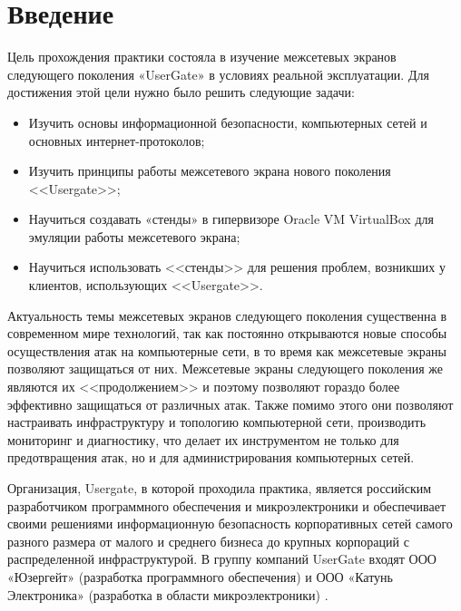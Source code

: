\newcommand{\definition}[1]{\textbf{#1}}

\newcommand{\CLIA}{\textbf{CLI-A}}
\newcommand{\CLIB}{\textbf{CLI-B}}
\newcommand{\CLIEXT}{\textbf{CLI-EXT}}
\newcommand{\DC}{\textbf{DC}}
\newcommand{\UTM}{\textbf{UTM}}
\newcommand{\ISP}{\textbf{ISP}}

\section{Введение}
	\begin{justify}
		\newPar{}Цель прохождения практики состояла в изучение межсетевых экранов следующего поколения «UserGate» в условиях реальной эксплуатации. Для достижения этой цели нужно было решить следующие задачи:
		
		\begin{itemize}[nosep]
			\item Изучить основы информационной безопасности, компьютерных сетей и основных интернет-протоколов;
			
			\item Изучить принципы работы межсетевого экрана нового поколения <<Usergate>>;
			
			\item Научиться создавать «стенды» в гипервизоре Oracle VM VirtualBox для эмуляции работы межсетевого экрана;
			
			\item Научиться использовать <<стенды>> для решения проблем, возникших у клиентов, использующих <<Usergate>>.
		\end{itemize}
		
		Актуальность темы межсетевых экранов следующего поколения существенна в современном мире технологий, так как постоянно открываются новые способы осуществления атак на компьютерные сети, в то время как межсетевые экраны позволяют защищаться от них. Межсетевые экраны следующего поколения же являются их <<продолжением>> и поэтому позволяют гораздо более эффективно защищаться от различных атак. Также помимо этого они позволяют настраивать инфраструктуру и топологию компьютерной сети, производить мониторинг и диагностику, что делает их инструментом не только для предотвращения атак, но и для администрирования компьютерных сетей.
		
		Организация, Usergate, в которой проходила практика, является российским разработчиком программного обеспечения и микроэлектроники и обеспечивает своими решениями информационную безопасность корпоративных сетей самого разного размера от малого и среднего бизнеса до крупных корпораций с распределенной инфраструктурой. В группу компаний UserGate входят ООО «Юзергейт» (разработка программного обеспечения) и ООО «Катунь Электроника» (разработка в области микроэлектроники) \cite{usergate}.		
		

\end{justify}
